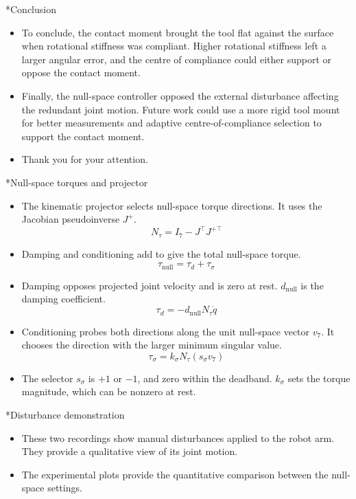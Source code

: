 \documentclass[12pt,a4paper]{article}
\makeatletter
\renewcommand\section{\@startsection{section}{1}{0pt}{14pt}{6pt}{\normalfont\Large\bfseries\color{navy}}}
\makeatother
\begin{document}
\section*{Conclusion}
\begin{itemize}
\item To conclude, the contact moment brought the tool flat against the surface when rotational stiffness was compliant. Higher rotational stiffness left a larger angular error, and the centre of compliance could either support or oppose the contact moment.
\item Finally, the null-space controller opposed the external disturbance affecting the redundant joint motion. Future work could use a more rigid tool mount for better measurements and adaptive centre-of-compliance selection to support the contact moment.
\item Thank you for your attention.
\end{itemize}

\section*{Null-space torques and projector}
\begin{itemize}
\item The kinematic projector selects null-space torque directions. It uses the Jacobian pseudoinverse \(J^+\).
\[
N_\tau=I_7-J^\top J^{+\top}
\]
\item Damping and conditioning add to give the total null-space torque.
\[
\tau_{\mathrm{null}}=\tau_d+\tau_\sigma
\]
\item Damping opposes projected joint velocity and is zero at rest. \(d_{\mathrm{null}}\) is the damping coefficient.
\[
\tau_d=-d_{\mathrm{null}}N_\tau\dot q
\]
\item Conditioning probes both directions along the unit null-space vector \(v_7\). It chooses the direction with the larger minimum singular value.
\[
\tau_\sigma=k_\sigma N_\tau(s_\sigma v_7)
\]
\item The selector \(s_\sigma\) is \(+1\) or \(-1\), and zero within the deadband. \(k_\sigma\) sets the torque magnitude, which can be nonzero at rest.
\end{itemize}

\section*{Disturbance demonstration}
\begin{itemize}
\item These two recordings show manual disturbances applied to the robot arm. They provide a qualitative view of its joint motion.
\item The experimental plots provide the quantitative comparison between the null-space settings.
\end{itemize}
\end{document}
